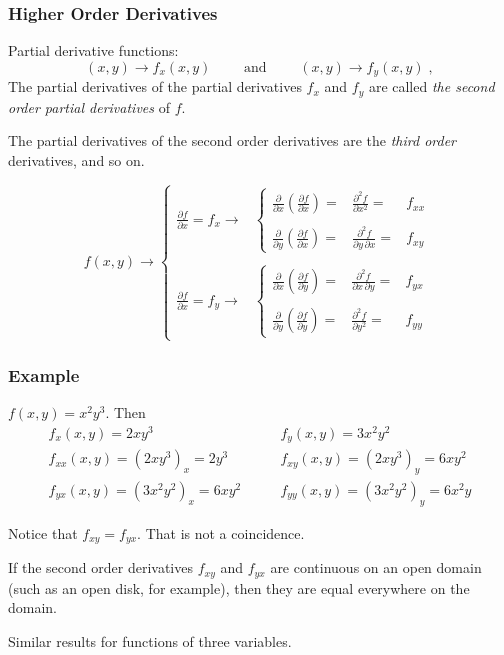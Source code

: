 \begin{frame}
  \frametitle{Higher Order Derivatives}
  Partial derivative functions:
%
$$(x,y) \to f_x(x,y) \qquad \text{ and } \qquad  (x,y) \to f_y(x,y)\; ,$$
%
\pause The partial derivatives of the partial derivatives $f_x$ and $f_y$ are called \emph{the second order partial derivatives} of $f$.

\pause The partial derivatives of the second order derivatives are the \emph{third order} derivatives, and so on.

$$f(x,y) \to \left\{ \begin{array}{cc}
  \frac{\partial f}{\partial x}=f_x  \to & \left\{ \begin{array}{ccc}
    \frac{\partial}{\partial x} \left( \frac{\partial f}{\partial x} \right) = & \frac{\partial^2 f}{\partial x^2} = & f_{xx} \\
    & & \\
    \frac{\partial}{\partial y} \left( \frac{\partial f}{\partial x} \right) = & \frac{\partial^2 f}{\partial y\,\partial x} = & f_{xy}
  \end{array} \right. \\
  & \\
  \frac{\partial f}{\partial x}=f_y  \to & \left\{ \begin{array}{ccc}
    \frac{\partial}{\partial x} \left( \frac{\partial f}{\partial y} \right) = & \frac{\partial^2 f}{\partial x\, \partial y} = & f_{yx} \\
    & & \\
    \frac{\partial}{\partial y} \left( \frac{\partial f}{\partial y} \right) = & \frac{\partial^2 f}{\partial y^2} = & f_{yy}
  \end{array} \right.
\end{array} \right.$$
\end{frame}

\begin{frame}
  \frametitle{Example}

  $f(x,y) = x^2y^3$. Then\pause
%
\begin{align*}
  f_x(x,y) = 2xy^3 \quad & \quad f_{y}(x,y) = 3x^2y^2 \\
  f_{xx}(x,y) = (2xy^3)_x = 2y^3 \quad & \quad f_{xy}(x,y) = (2xy^3)_y = 6xy^2 \\
  f_{yx}(x,y) = (3x^2y^2)_x = 6xy^2 \quad & \quad f_{yy}(x,y) = (3x^2y^2)_y = 6x^2y
\end{align*}

\pause Notice that $f_{xy} = f_{yx}$. That is not a coincidence.

\begin{theorem}[Clairaut] If the second order derivatives $f_{xy}$ and $f_{yx}$ are continuous on an open domain (such as an open disk, for example), then they are equal everywhere on the domain.
\end{theorem}

Similar results for functions of three variables.
\end{frame}

